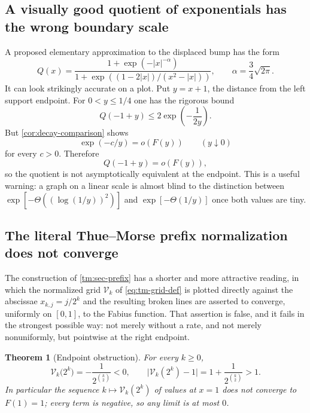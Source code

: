 \documentclass[11pt,oneside]{article}
\newtheorem{theorem}{Theorem}[section]
\theoremstyle{definition}
\theoremstyle{remark}
\begin{document}
\subsection{A visually good quotient of exponentials has the wrong boundary scale}

A proposed elementary approximation to the displaced bump has the form
\begin{equation}
 Q(x)=
 \frac{1+\exp\!\left(-|x|^{-\alpha}\right)}
 {1+\exp\!\left((1-2|x|)/(x^2-|x|)\right)},
 \qquad
 \alpha=\frac34\sqrt{2\pi}.                               \label{eq:quotient-candidate}
\end{equation}
It can look strikingly accurate on a plot.  Put $y=x+1$, the distance from the left support
endpoint.  For $0<y\le1/4$ one has the rigorous bound
\begin{equation}
 Q(-1+y)\le2\exp\!\left(-\frac{1}{2y}\right).              \label{eq:quotient-bound}
\end{equation}
But \cref{cor:decay-comparison} shows
\begin{equation}
 \exp(-c/y)=o(F(y))
 \qquad(y\downarrow0)
\end{equation}
for every $c>0$.  Therefore
\begin{equation}
 Q(-1+y)=o(F(y)),                                         \label{eq:quotient-mismatch}
\end{equation}
so the quotient is not asymptotically equivalent at the endpoint.  This is a useful warning:
a graph on a linear scale is almost blind to the distinction between
$\exp[-\Theta((\log(1/y))^2)]$ and $\exp[-\Theta(1/y)]$ once both values are tiny.

\subsection{The literal Thue--Morse prefix normalization does not converge}
\label{tm:sub-literal-endpoint}

The construction of \cref{tm:sec-prefix} has a shorter and more attractive reading, in
which the normalized grid $\mathcal V_k$ of \eqref{eq:tm-grid-def} is plotted directly
against the abscissae $x_{k,j}=j/2^k$ and the resulting broken lines are asserted to
converge, uniformly on $[0,1]$, to the Fabius function.  That assertion is false, and it
fails in the strongest possible way: not merely without a rate, and not merely
nonuniformly, but pointwise at the right endpoint.

\begin{theorem}[Endpoint obstruction]
\label{thm:tm-literal-divergence}
For every $k\ge0$,
\begin{equation}
 \mathcal V_k\bigl(2^k\bigr)=-\frac1{2^{\binom k2}}<0,
 \qquad
 \bigl|\mathcal V_k(2^k)-1\bigr|=1+\frac1{2^{\binom k2}}>1.
                                                          \label{eq:tm-literal-endpoint}
\end{equation}
In particular the sequence $k\mapsto\mathcal V_k(2^k)$ of values at $x=1$ does not converge
to $F(1)=1$; every term is negative, so any limit is at most $0$.
\end{theorem}
\end{document}
